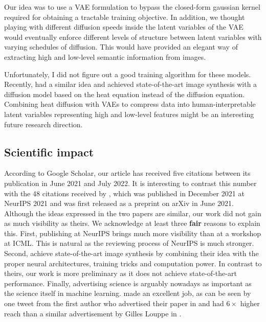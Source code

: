 Our idea was to use a VAE formulation to bypass the closed-form gaussian kernel required for obtaining a tractable training objective. In addition, we thought playing with different diffusion speeds inside the latent variables of the VAE would eventually enforce different levels of structure between latent variables with varying schedules of diffusion. This would have provided an elegant way of extracting high and low-level semantic information from images.

Unfortunately, I did not figure out a good training algorithm for these models. Recently, \citet{rissanen2022generative} had a similar idea and achieved state-of-the-art image synthesis with a diffusion model based on the heat equation instead of the diffusion equation. Combining heat diffusion with VAEs to compress data into human-interpretable latent variables representing high and low-level features might be an interesting future research direction.

\subsection{Scientific impact}

According to Google Scholar, our article has received five citations between its publication in June 2021 and July 2022. It is interesting to contrast this number with the 48 citations received by \citet{vahdat2021score}, which was published in December 2021 at NeurIPS 2021 and was first released as a preprint on arXiv in June 2021. Although the ideas expressed in the two papers are similar, our work did not gain as much visibility as theirs. We acknowledge at least three \textbf{fair} reasons to explain this. First, publishing at NeurIPS brings much more visibility than at a workshop at ICML. This is natural as the reviewing process of NeurIPS is much stronger. Second, \citet{vahdat2021score} achieve state-of-the-art image synthesis by combining their idea with the proper neural architectures, training tricks and computation power.
In contrast to theirs, our work is more preliminary as it does not achieve state-of-the-art performance. Finally, advertising science is arguably nowadays as important as the science itself in machine learning.\citet{vahdat2021score} made an excellent job, as can be seen by one tweet from the first author who advertised their paper in  and had $6\times$ higher reach than a similar advertisement by Gilles Louppe in .

